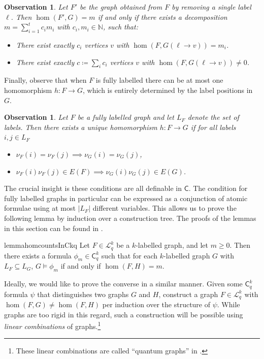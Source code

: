 \documentclass[10pt,a4paper]{article}
\newcommand{\N}{\ensuremath{\mathbb{N}}}
\newcommand{\Lkq}{\ensuremath{\mathcal{L}_{q}^{k}}}
\newcommand{\lC} {\ensuremath{\mathsf C}}
\newtheorem{observation}[theorem]{Observation}
\begin{document}
\begin{observation}\label{prp:homlabeldel}
  Let $F'$ be the graph obtained from $F$ by removing a single label $\ell$. Then $\hom(F', G) = m$ if and only if there exists a decomposition $m = \sum_{i=1}^tc_im_i$ with $c_i, m_i \in \N$, such that:
  \begin{itemize}
  \item There exist exactly $c_i$ vertices $v$ with $\hom(F, G(\ell \rightarrow v)) = m_i$.
    \item There exist exactly $c \coloneqq \sum_i c_i$ vertices $v$ with $\hom(F, G(\ell \rightarrow v)) \neq 0$.
  \end{itemize}
\end{observation}

Finally, observe that when $F$ is fully labelled there can be at most one homomorphism $h \colon F \to G$, which is entirely determined by the label positions in $G$.

\begin{observation}
  Let $F$ be a fully labelled graph and let $L_F$ denote the set of labels. Then there exists a unique homomorphism $h \colon F \to G$ if for all labels $i, j \in L_F$
  \begin{itemize}
  \item $\nu_F(i) = \nu_F(j) \implies \nu_G(i) = \nu_G(j)$,
  \item $\nu_F(i)\nu_F(j) \in E(F) \implies \nu_G(i)\nu_G(j) \in E(G)$.
  \end{itemize}
\end{observation}

The crucial insight is these conditions are all definable in $\lC$. The condition for fully labelled graphs in particular can be expressed as a conjunction of atomic formulae using at most $|L_F|$ different variables. This allows us to prove the following lemma by induction over a construction tree.
The proofs of the lemmas in this section can be found in .

\begin{restatable}{lemma}{homcountsInCkq}
  \label{lem:homcounts_in_ckq}
  Let $F \in \Lkq$ be a $k$-labelled graph, and let $m \geq 0$. Then there exists a formula $\phi_m \in \lC^k_q$ such that for each $k$-labelled graph $G$ with $L_F \subseteq L_G$, $G \models \phi_m$ if and only if $\hom(F, H) = m$.
\end{restatable}

Ideally, we would like to prove the converse in a similar manner. Given some $\lC^k_q$ formula $\psi$ that distinguishes two graphs $G$ and $H$, construct a graph $F \in \Lkq$ with $\hom(F, G) \neq \hom(F, H)$ per induction over the structure of $\psi$. While graphs are too rigid in this regard, such a construction will be possible using \emph{linear combinations} of graphs.\footnote{These linear combinations are called ``quantum graphs'' in \cite{dvorak_recognizing_2010}.}
\end{document}
